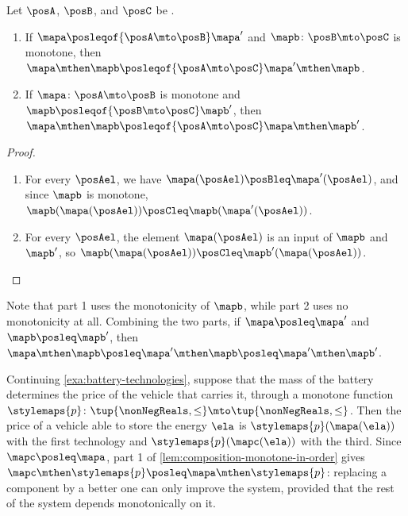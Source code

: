 \begin{lemma}
    \label{lem:composition-monotone-in-order}
    Let $\posA$, $\posB$, and $\posC$ be .
    \begin{enumerate}
        \item If $\mapa \posleqof{\posA \mto \posB} \mapa'$ and $\mapb \colon \posB \mto \posC$ is monotone, then $\mapa \mthen \mapb \posleqof{\posA \mto \posC} \mapa' \mthen \mapb$.
        \item If $\mapa \colon \posA \mto \posB$ is monotone and $\mapb \posleqof{\posB \mto \posC} \mapb'$, then $\mapa \mthen \mapb \posleqof{\posA \mto \posC} \mapa \mthen \mapb'$.
    \end{enumerate}
\end{lemma}
\begin{proof}
    \begin{enumerate}
        \item For every $\posAel$, we have $\mapa(\posAel) \posBleq \mapa'(\posAel)$, and since $\mapb$ is monotone, $\mapb(\mapa(\posAel)) \posCleq \mapb(\mapa'(\posAel))$.
        \item For every $\posAel$, the element $\mapa(\posAel)$ is an input of $\mapb$ and $\mapb'$, so $\mapb(\mapa(\posAel)) \posCleq \mapb'(\mapa(\posAel))$.
    \end{enumerate}
\end{proof}

Note that part 1 uses the monotonicity of $\mapb$, while part 2 uses no monotonicity at all.
Combining the two parts, if $\mapa \posleq \mapa'$ and $\mapb \posleq \mapb'$, then $\mapa \mthen \mapb \posleq \mapa' \mthen \mapb \posleq \mapa' \mthen \mapb'$.

\begin{example}
    Continuing \cref{exa:battery-technologies}, suppose that the mass of the battery determines the price of the vehicle that carries it, through a monotone function $\stylemaps{p} \colon \tup{\nonNegReals, \leq} \mto \tup{\nonNegReals, \leq}$.
    Then the price of a vehicle able to store the energy $\ela$ is $\stylemaps{p}(\mapa(\ela))$ with the first technology and $\stylemaps{p}(\mapc(\ela))$ with the third.
    Since $\mapc \posleq \mapa$, part 1 of \cref{lem:composition-monotone-in-order} gives $\mapc \mthen \stylemaps{p} \posleq \mapa \mthen \stylemaps{p}$: replacing a component by a better one can only improve the system, provided that the rest of the system depends monotonically on it.
\end{example}
